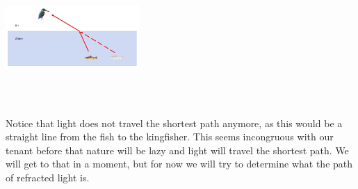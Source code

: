 \includegraphics*[height=2in,width=2in]{Figures/Fermat5}

Notice that light does not travel the shortest path anymore, as this
would be a straight line from the fish to the kingfisher.  This seems
incongruous with our tenant before that nature will be lazy and light
will travel the shortest path.  We will get to that in a moment, but
for now we will try to determine what the path of refracted light is.

